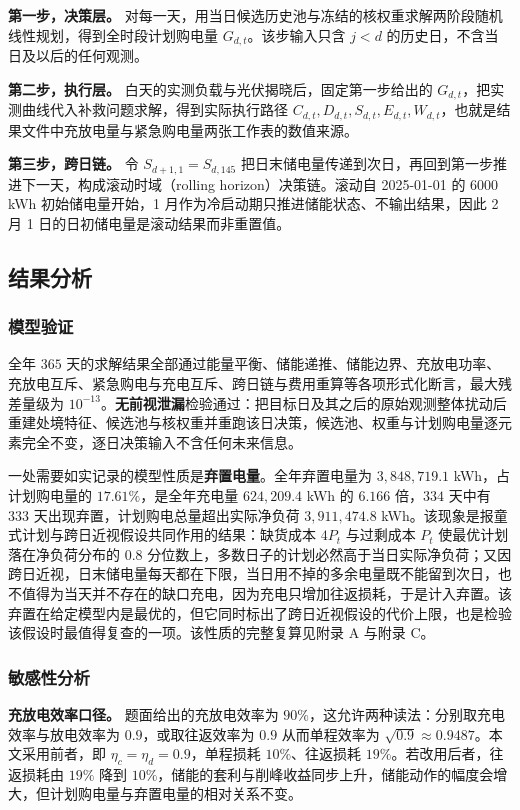 \textbf{第一步，决策层。} 对每一天，用当日候选历史池与冻结的核权重求解两阶段随机线性规划，得到全时段计划购电量 $G_{d,t}$。该步输入只含 $j<d$ 的历史日，不含当日及以后的任何观测。

\textbf{第二步，执行层。} 白天的实测负载与光伏揭晓后，固定第一步给出的 $G_{d,t}$，把实测曲线代入补救问题求解，得到实际执行路径 $C_{d,t},D_{d,t},S_{d,t},E_{d,t},W_{d,t}$，也就是结果文件中充放电量与紧急购电量两张工作表的数值来源。

\textbf{第三步，跨日链。} 令 $S_{d+1,1}=S_{d,145}$ 把日末储电量传递到次日，再回到第一步推进下一天，构成滚动时域（rolling horizon）决策链。滚动自 2025-01-01 的 $6000$ kWh 初始储电量开始，1 月作为冷启动期只推进储能状态、不输出结果，因此 2 月 1 日的日初储电量是滚动结果而非重置值。

\subsection{结果分析}

\subsubsection{模型验证}

全年 $365$ 天的求解结果全部通过能量平衡、储能递推、储能边界、充放电功率、充放电互斥、紧急购电与充电互斥、跨日链与费用重算等各项形式化断言，最大残差量级为 $10^{-13}$。\textbf{无前视泄漏}检验通过：把目标日及其之后的原始观测整体扰动后重建处境特征、候选池与核权重并重跑该日决策，候选池、权重与计划购电量逐元素完全不变，逐日决策输入不含任何未来信息。

一处需要如实记录的模型性质是\textbf{弃置电量}。全年弃置电量为 $3{,}848{,}719.1$ kWh，占计划购电量的 $17.61\%$，是全年充电量 $624{,}209.4$ kWh 的 $6.166$ 倍，$334$ 天中有 $333$ 天出现弃置，计划购电总量超出实际净负荷 $3{,}911{,}474.8$ kWh。该现象是报童式计划与跨日近视假设共同作用的结果：缺货成本 $4P_t$ 与过剩成本 $P_t$ 使最优计划落在净负荷分布的 $0.8$ 分位数上，多数日子的计划必然高于当日实际净负荷；又因跨日近视，日末储电量每天都在下限，当日用不掉的多余电量既不能留到次日，也不值得为当天并不存在的缺口充电，因为充电只增加往返损耗，于是计入弃置。该弃置在给定模型内是最优的，但它同时标出了跨日近视假设的代价上限，也是检验该假设时最值得复查的一项。该性质的完整复算见附录 A 与附录 C。

\subsubsection{敏感性分析}

\textbf{充放电效率口径。} 题面给出的充放电效率为 $90\%$，这允许两种读法：分别取充电效率与放电效率为 $0.9$，或取往返效率为 $0.9$ 从而单程效率为 $\sqrt{0.9}\approx0.9487$。本文采用前者，即 $\eta_c=\eta_d=0.9$，单程损耗 $10\%$、往返损耗 $19\%$。若改用后者，往返损耗由 $19\%$ 降到 $10\%$，储能的套利与削峰收益同步上升，储能动作的幅度会增大，但计划购电量与弃置电量的相对关系不变。

